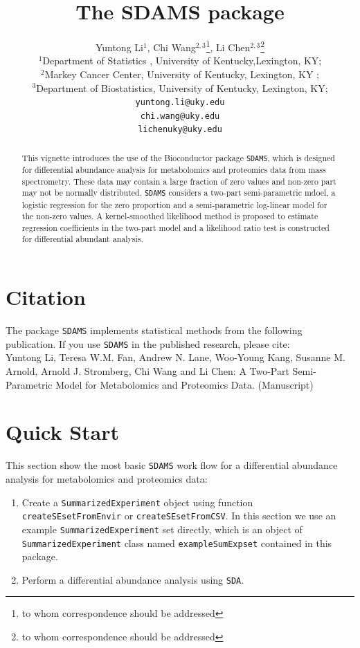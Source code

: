 \documentclass[12pt]{article}
\author{Yuntong Li$^{1}$, Chi Wang$^{2,3}$\footnote{to whom correspondence
should be addressed}, Li Chen$^{2,3}$\footnote{to whom correspondence
should be addressed}\\[1em]
\small{$^{1}$Department of Statistics , University of Kentucky,Lexington, KY;}\\
\small{$^{2}$Markey Cancer Center, University of Kentucky, Lexington, KY ;}\\
\small{$^{3}$Department of Biostatistics, University of Kentucky,
Lexington, KY;}\\
\small{\texttt{yuntong.li@uky.edu}}\\
\small{\texttt{chi.wang@uky.edu}}\\
\small{\texttt{lichenuky@uky.edu}}}
\title{\textsf{\textbf{The SDAMS package}}}
\begin{document}

\maketitle

\begin{abstract}
This vignette introduces the use of the Bioconductor package
{\tt SDAMS}, which is designed for differential abundance analysis for
metabolomics and proteomics data from mass spectrometry. These data may contain
a large fraction of zero values and non-zero part may not be normally
distributed. {\tt SDAMS} considers a two-part semi-parametric mdoel, a logistic
regression for the zero proportion and a semi-parametric log-linear model for
the non-zero values. A kernel-smoothed likelihood method is proposed to estimate
regression coefficients in the two-part model and a likelihood ratio test is
constructed for differential abundant analysis.

\end{abstract}


\newpage

\tableofcontents

\newpage


\section{Citation}
The package {\tt SDAMS} implements statistical methods from the following
publication. If you use {\tt SDAMS} in the published research, please cite: \\
Yuntong Li, Teresa W.M. Fan, Andrew N. Lane, Woo-Young Kang, Susanne M. Arnold,
Arnold J. Stromberg, Chi Wang and Li Chen: A Two-Part Semi-Parametric Model for
Metabolomics and Proteomics Data. (Manuscript)

\section{Quick Start}
This section show the most basic {\tt SDAMS} work flow for a differential
abundance analysis for metabolomics and proteomics data:
\begin{enumerate}
\item Create a {\tt SummarizedExperiment} object using function
      {\tt createSEsetFromEnvir} or {\tt createSEsetFromCSV}.
      In this section we use an example {\tt SummarizedExperiment} set directly,
      which is an object of {\tt SummarizedExperiment} class named
      {\tt exampleSumExpset} contained in this package.
\item Perform a differential abundance analysis using {\tt SDA}.
\end{enumerate}
\end{document}
